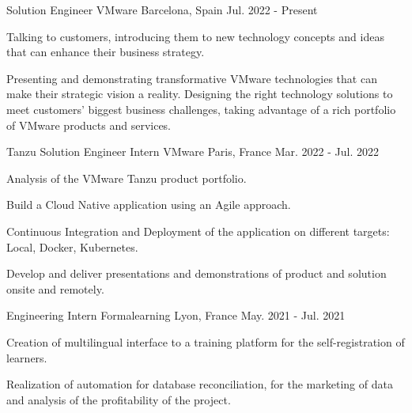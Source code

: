 

\begin{cventries}

  \cventry
    {Solution Engineer} %
    {VMware} %
    {Barcelona, Spain} %
    {Jul. 2022 - Present} %
    {
      \begin{cvitems} %
        \item {Talking to customers, introducing them to new technology concepts and ideas that can enhance their business strategy.}
        \item {Presenting and demonstrating transformative VMware technologies that can make their strategic vision a reality. Designing the right technology solutions to meet customers' biggest business challenges, taking advantage of a rich portfolio of VMware products and services.}
      \end{cvitems}
    }

  \cventry
    {Tanzu Solution Engineer Intern} %
    {VMware} %
    {Paris, France} %
    {Mar. 2022 - Jul. 2022} %
    {
      \begin{cvitems} %
        \item {Analysis of the VMware Tanzu product portfolio.}
        \item {Build a Cloud Native application using an Agile approach.}
        \item {Continuous Integration and Deployment of the application on different targets: Local, Docker, Kubernetes.}
        \item {Develop and deliver presentations and demonstrations of product and solution onsite and remotely.}
      \end{cvitems}
    }

  \cventry
    {Engineering Intern} %
    {Formalearning} %
    {Lyon, France} %
    {May. 2021 - Jul. 2021} %
    {
      \begin{cvitems} %
        \item {Creation of multilingual interface to a training platform for the self-registration of learners.}
        \item {Realization of automation for database reconciliation, for the marketing of data and analysis of the profitability of the project.}
      \end{cvitems}
    }


\end{cventries}
